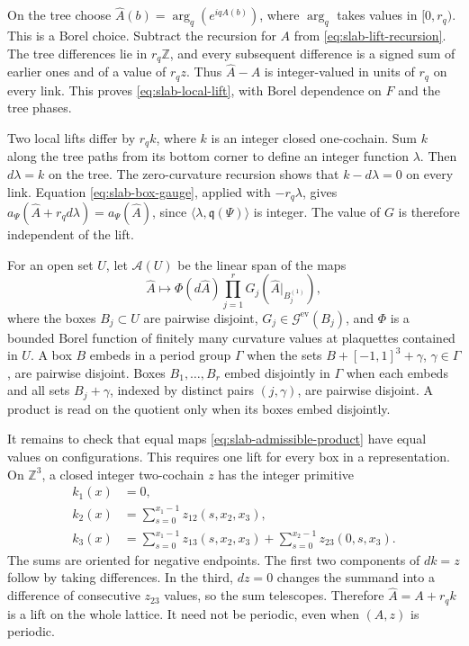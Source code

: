 \documentclass[11pt,letterpaper,reqno]{amsart}
\newcommand{\Z}{\mathbb Z}
\begin{document}
On the tree choose $\widehat A(b)=\arg_q(e^{iqA(b)})$, where
$\arg_q$ takes values in $[0,r_q)$. This is a Borel choice. Subtract
the recursion for $A$ from \eqref{eq:slab-lift-recursion}. The tree
differences lie in $r_q\Z$, and every subsequent difference is a signed
sum of earlier ones and of a value of $r_qz$. Thus
$\widehat A-A$ is integer-valued in units of $r_q$ on every link. This
proves \eqref{eq:slab-local-lift}, with Borel dependence on $F$ and the
tree phases.

Two local lifts differ by $r_qk$, where $k$ is an integer closed
one-cochain. Sum $k$ along the tree paths from its bottom corner to
define an integer function $\lambda$. Then $d\lambda=k$ on the tree.
The zero-curvature recursion shows that $k-d\lambda=0$ on every link.
Equation \eqref{eq:slab-box-gauge}, applied with $-r_q\lambda$, gives
$a_\Psi(\widehat A+r_qd\lambda)=a_\Psi(\widehat A)$, since
$\langle\lambda,\mathfrak q(\Psi)\rangle$ is integer. The value of $G$
is therefore independent of the lift.

For an open set $U$, let $\mathcal A(U)$ be the linear span of the maps
\begin{equation}\label{eq:slab-admissible-product}
 \widehat A\longmapsto\Phi(d\widehat A)
                   \prod_{j=1}^rG_j(\widehat A|_{B_j^{(1)}}),
\end{equation}
where the boxes $B_j\subset U$ are pairwise disjoint,
$G_j\in\mathcal G^{\mathrm{ev}}(B_j)$, and $\Phi$ is a bounded Borel
function of finitely many curvature values at plaquettes contained in
$U$. A box $B$ embeds in a period group $\Gamma$ when the sets
$B+[-1,1]^3+\gamma$, $\gamma\in\Gamma$, are pairwise disjoint.
Boxes $B_1,\ldots,B_r$ embed disjointly in $\Gamma$ when each
embeds and all sets $B_j+\gamma$, indexed by distinct pairs
$(j,\gamma)$, are pairwise disjoint. A product is read on the
quotient only when its boxes embed disjointly.

It remains to check that equal maps \eqref{eq:slab-admissible-product}
have equal values on configurations. This requires one lift for every
box in a representation. On $\Z^3$, a closed integer two-cochain $z$
has the integer primitive
\begin{align*}
 k_1(x)&=0,\\
 k_2(x)&=\sum_{s=0}^{x_1-1}z_{12}(s,x_2,x_3),\\
 k_3(x)&=\sum_{s=0}^{x_1-1}z_{13}(s,x_2,x_3)
                    +\sum_{s=0}^{x_2-1}z_{23}(0,s,x_3).
\end{align*}
The sums are oriented for negative endpoints. The first two components
of $dk=z$ follow by taking differences. In the third, $dz=0$ changes
the summand into a difference of consecutive $z_{23}$ values, so the
sum telescopes. Therefore $\widehat A=A+r_qk$ is a lift on the whole
lattice. It need not be periodic, even when $(A,z)$ is periodic.
\end{document}
